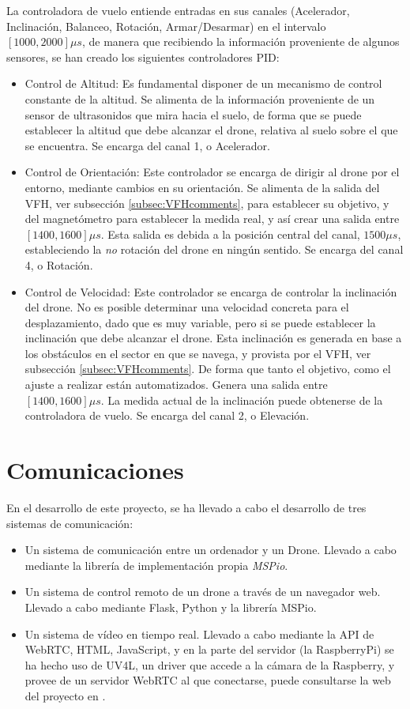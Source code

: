 La controladora de vuelo entiende entradas en sus canales (Acelerador, Inclinación, Balanceo, Rotación, Armar/Desarmar) en el intervalo $[1000, 2000]\mu s$, de manera que recibiendo la información proveniente de algunos sensores, se han creado los siguientes controladores PID: 

\begin{itemize}
\item Control de Altitud: Es fundamental disponer de un mecanismo de control constante de la altitud. Se alimenta de la información proveniente de un sensor de ultrasonidos que mira hacia el suelo, de forma que se puede establecer la altitud que debe alcanzar el drone, relativa al suelo sobre el que se encuentra. Se encarga del canal 1, o Acelerador.
\item Control de Orientación: Este controlador se encarga de dirigir al drone por el entorno, mediante cambios en su orientación. Se alimenta de la salida del VFH, ver subsección \ref{subsec:VFHcomments}, para establecer su objetivo, y del magnetómetro para establecer la medida real, y así crear una salida entre $[1400, 1600]\mu s$.
Esta salida es debida a la posición central del canal, $1500\mu s$, estableciendo la \emph{no} rotación del drone en ningún sentido. Se encarga del canal 4, o Rotación.
\item Control de Velocidad: Este controlador se encarga de controlar la inclinación del drone. No es posible determinar una velocidad concreta para el desplazamiento, dado que es muy variable, pero si se puede establecer la inclinación que debe alcanzar el drone. Esta inclinación es generada en base a los obstáculos en el sector en que se navega, y provista por el VFH, ver subsección \ref{subsec:VFHcomments}. De forma que tanto el objetivo, como el ajuste a realizar están automatizados. Genera una salida entre $[1400, 1600]\mu s$. La medida actual de la inclinación puede obtenerse de la controladora de vuelo. Se encarga del canal 2, o Elevación.
\end{itemize}


\section{Comunicaciones}

En el desarrollo de este proyecto, se ha llevado a cabo el desarrollo de tres sistemas de comunicación: 

\begin{itemize}
\item Un sistema de comunicación entre un ordenador y un Drone. Llevado a cabo mediante la librería de implementación propia \emph{MSPio}.
\item Un sistema de control remoto de un drone a través de un navegador web. Llevado a cabo mediante Flask, Python y la librería MSPio.
\item Un sistema de vídeo en tiempo real. Llevado a cabo mediante la API de WebRTC, HTML, JavaScript, y en la parte del servidor (la RaspberryPi) se ha hecho uso de UV4L, un driver que accede a la cámara de la Raspberry, y provee de un servidor WebRTC al que conectarse, puede consultarse la web del proyecto en \citep{wiki:uv4l}.
\end{itemize}

